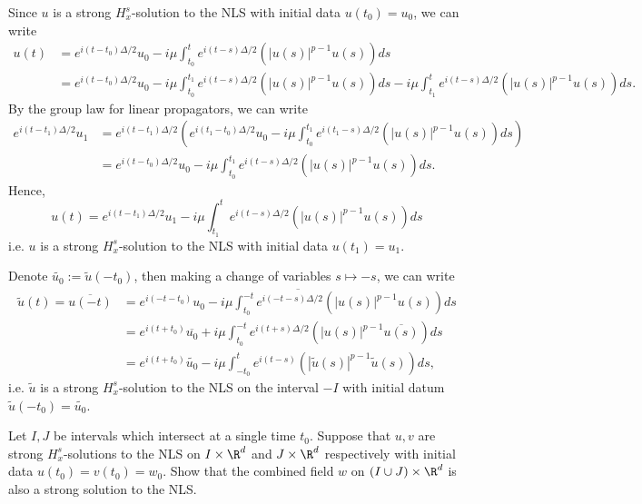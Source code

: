 \begin{solution}
	Since $u$ is a strong $H^s_x$-solution to the NLS with initial data $u(t_0) = u_0$, we can write
		\begin{align*}
			u(t) 
				&= e^{i (t - t_0) \Delta/2} u_0 - i \mu \int_{t_0}^t e^{i (t - s) \Delta/2} \left( |u(s)|^{p - 1} u(s) \right) ds \\
				&= e^{i (t - t_0) \Delta/2} u_0 - i \mu \int_{t_0}^{t_1} e^{i (t - s) \Delta/2} \left( |u(s)|^{p - 1} u(s) \right) ds - i \mu \int_{t_1}^{t} e^{i (t - s) \Delta/2} \left( |u(s)|^{p - 1} u(s) \right) ds.
		\end{align*}
	By the group law for linear propagators, we can write
		\begin{align*}
			e^{i (t - t_1) \Delta/2} u_1
				&= e^{i (t - t_1)\Delta/2} \left( e^{i (t_1 - t_0) \Delta/2} u_0 - i \mu \int_{t_0}^{t_1} e^{i ({t_1} - s) \Delta/2} \left( |u(s)|^{p - 1} u(s) \right) ds\right) \\
				&= e^{i (t - t_0) \Delta/2} u_0 - i \mu \int_{t_0}^{t_1} e^{i (t - s) \Delta/2} \left( |u(s)|^{p - 1} u(s) \right) ds.
		\end{align*}	
	Hence, 	
		\[u(t) = e^{i (t - t_1) \Delta/2} u_1 - i \mu \int_{t_1}^{t} e^{i (t - s) \Delta/2} \left( |u(s)|^{p - 1} u(s) \right) ds\]	
	i.e. $u$ is a strong $H^s_x$-solution to the NLS with initial data $u (t_1) = u_1$. 	
	
	Denote $\widetilde{u_0} := \widetilde u(-t_0)$, then making a change of variables $s \mapsto - s$, we can write
	\begin{align*}
		\widetilde u(t)=\overline{u(-t)}
			&= \overline{e^{i (-t - t_0)} u_0 - i \mu \int_{t_0}^{-t} e^{i (-t - s) \Delta/2} \left( |u(s)|^{p - 1} u(s) \right) ds} \\
			&= e^{i (t + t_0)} \overline{u_0} + i \mu \int_{t_0}^{-t} e^{i (t + s) \Delta/2} \left( |u(s)|^{p - 1} \overline{u(s)} \right) ds \\
			&= e^{i (t + t_0)} \widetilde{u_0} - i \mu \int_{-t_0}^t e^{i (t - s)} \left( |\widetilde{u} (s)|^{p - 1} \widetilde{u} (s) \right) ds,
	\end{align*}
	i.e. $\widetilde u$ is a strong $H^s_x$-solution to the NLS on the interval $-I$ with initial datum $\widetilde u (-t_0) = \widetilde{u_0}$. 
\end{solution}

\begin{statement}
	Let $I, J$ be intervals which intersect at a single time $t_0$. Suppose that $u, v$ are strong $H^s_x$-solutions to the NLS on $I \times \R^d$ and $J \times \R^d$ respectively with initial data $u(t_0) = v(t_0) = w_0$. Show that the combined field $w$ on $(I \cup J) \times \R^d$ is also a strong solution to the NLS. 
\end{statement}

